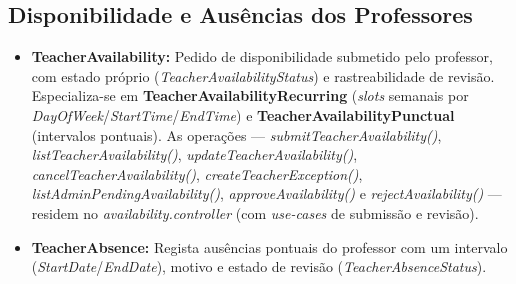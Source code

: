 \documentclass[12pt,a4paper]{report}
\begin{document}
\subsection{Disponibilidade e Ausências dos Professores}
\begin{itemize}
    \item \textbf{TeacherAvailability:} Pedido de disponibilidade submetido pelo
    professor, com estado próprio (\textit{TeacherAvailabilityStatus}) e
    rastreabilidade de revisão. Especializa-se em
    \textbf{TeacherAvailabilityRecurring} (\textit{slots} semanais por
    \textit{DayOfWeek}/\textit{StartTime}/\textit{EndTime}) e
    \textbf{TeacherAvailabilityPunctual} (intervalos pontuais). As operações
    --- \textit{submitTeacherAvailability()}, \textit{listTeacherAvailability()},
    \textit{updateTeacherAvailability()}, \textit{cancelTeacherAvailability()},
    \textit{createTeacherException()}, \textit{listAdminPendingAvailability()},
    \textit{approveAvailability()} e \textit{rejectAvailability()} --- residem no
    \textit{availability.controller} (com \textit{use-cases} de submissão e revisão).

    \item \textbf{TeacherAbsence:} Regista ausências pontuais do professor com um
    intervalo (\textit{StartDate}/\textit{EndDate}), motivo e estado de revisão
    (\textit{TeacherAbsenceStatus}).
\end{itemize}
\end{document}
